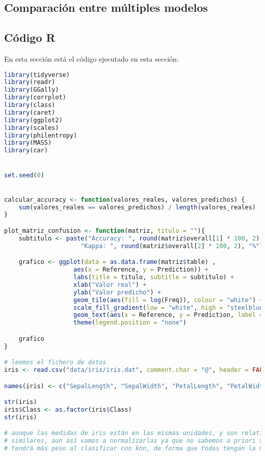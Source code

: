 \begin{figure}[H]
	\centering
	
	\label{fig:predicciones_qda}
\end{figure}

\subsection{Comparación entre múltiples modelos}


\subsection{Código R}

En esta sección está el código ejecutado en esta sección:


\begin{lstlisting}[language=R]
library(tidyverse)
library(readr)
library(GGally)
library(corrplot)
library(class)
library(caret)
library(ggplot2)
library(scales)
library(philentropy)
library(MASS)
library(car)


set.seed(0)


calcular_accuracy <- function(valores_reales, valores_predichos) {
	sum(valores_reales == valores_predichos) / length(valores_reales)
}

plot_matriz_confusion <- function(matriz, titulo = ""){
	subtitulo <- paste("Accuracy: ", round(matriz$overall[1] * 100, 2), "% \t",
					 "Kappa: ", round(matriz$overall[2] * 100, 2), "%")

	grafico <- ggplot(data = as.data.frame(matriz$table) ,
				   aes(x = Reference, y = Prediction)) +
				   labs(title = titulo, subtitle = subtitulo) +
				   xlab("Valor real") +
				   ylab("Valor predicho") +
				   geom_tile(aes(fill = log(Freq)), colour = "white") +
				   scale_fill_gradient(low = "white", high = "steelblue") +
				   geom_text(aes(x = Reference, y = Prediction, label = Freq)) +
				   theme(legend.position = "none")

	grafico
}

# leemos el fichero de datos
iris <- read.csv("data/iris/iris.dat", comment.char = "@", header = FALSE)

names(iris) <- c("SepalLength", "SepalWidth", "PetalLength", "PetalWidth", "Class")

str(iris)
iris$Class <- as.factor(iris$Class)
str(iris)

# aunque las medidas de iris están en las mismas unidades, y son relativamente
# similares, aun así vamos a normalizarlas ya que no sabemos a priori si alguna
# tendrá más peso al clasificar con knn, de forma que todas tengan la misma importancia


\end{lstlisting}
